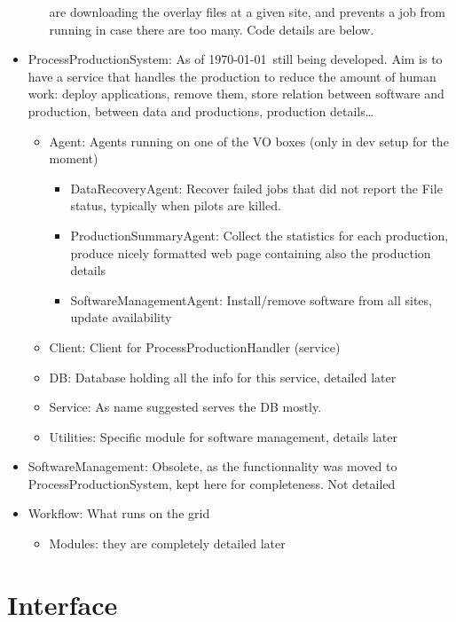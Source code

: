 \documentclass[a4paper,12pt]{article}
\begin{document}
\begin{itemize}
\begin{itemize}
    are downloading the overlay files at a given site, and prevents a job from
    running in case there are too many. Code details are below.
  \end{itemize}
  \item ProcessProductionSystem: As of \today\ still being developed. Aim
  is to have a service that handles the production to reduce the amount of human work:
  deploy applications, remove them, store relation between software and
  production, between data and productions, production details\ldots
  \begin{itemize}
    \item Agent: Agents running on one of the VO boxes (only in dev setup for
    the moment)
    \begin{itemize}
      \item DataRecoveryAgent: Recover failed jobs that did not report the File
      status, typically when pilots are killed.
      \item ProductionSummaryAgent: Collect the statistics for each production,
      produce nicely formatted web page containing also the production details
      \item SoftwareManagementAgent: Install/remove software from all sites,
      update availability
    \end{itemize}
    \item Client: Client for ProcessProductionHandler (service)
    \item DB: Database holding all the info for this service, detailed later
    \item Service: As name suggested serves the DB mostly.
    \item Utilities: Specific module for software management, details later
  \end{itemize}
  \item SoftwareManagement: Obsolete, as the functionnality was moved to
  ProcessProductionSystem, kept here for completeness. Not detailed
  \item Workflow: What runs on the grid
  \begin{itemize}
    \item Modules: they are completely detailed later
  \end{itemize}
\end{itemize}


\section{Interface}
\end{document}
